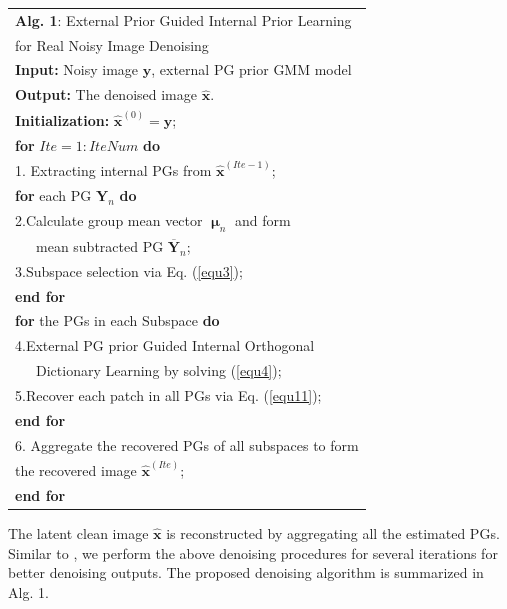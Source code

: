 \documentclass[10pt,twocolumn,letterpaper]{article}
\begin{document}
\begin{table}\label{alg1}
\begin{tabular}{l}
\hline
\textbf{Alg. 1}: External Prior Guided Internal Prior Learning
\\
\quad \quad \quad for Real Noisy Image Denoising
\\
\hline
\textbf{Input:} Noisy image $\mathbf{y}$, external PG prior GMM model
\\
\textbf{Output:} The denoised image $\hat{\mathbf{x}}$.
\\
\textbf{Initialization:} $\hat{\mathbf{x}}^{(0)}=\mathbf{y}$;
\\
\textbf{for} $Ite = 1:IteNum$ \textbf{do}
\\
1. Extracting internal PGs from $\hat{\mathbf{x}}^{(Ite-1)}$;
\\
\quad\textbf{for} each PG $\mathbf{Y}_{n}$ \textbf{do}
\\
2.\quad Calculate group mean vector $\boldsymbol{\upmu}_{n}$ and form 
\\
\quad \ \ \ mean subtracted PG $\mathbf{\overline{Y}}_{n}$;
\\
3.\quad Subspace selection via Eq. (\ref{equ3});
\\
\quad\textbf{end for}
\\
\quad\textbf{for} the PGs in each Subspace \textbf{do}
\\
4.\quad External PG prior Guided Internal Orthogonal
\\
\quad \ \ \ Dictionary Learning by solving (\ref{equ4});
\\
5.\quad Recover each patch in all PGs via Eq. (\ref{equ11});
\\
\quad\textbf{end for}
\\
6. Aggregate the recovered PGs of all subspaces to form
\\
\quad the recovered image $\hat{\mathbf{x}}^{(Ite)}$;
\\
\textbf{end for}
\\
\hline
\end{tabular}
\end{table}
The latent clean image $\hat{\mathbf{x}}$ is reconstructed by aggregating all the estimated PGs. Similar to \cite{pgpd}, we perform the above denoising procedures for several iterations for better denoising outputs. The proposed denoising algorithm is summarized in Alg. 1.
\end{document}
